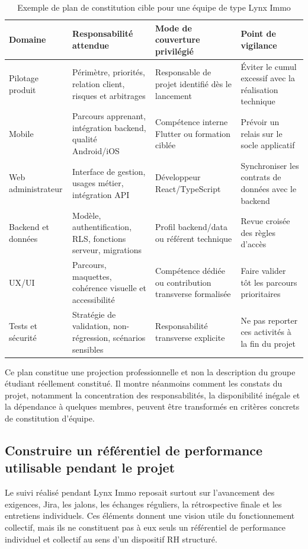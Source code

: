 \begin{table}[H]
\centering
\small
\begin{tabular}{p{3.4cm} p{4.4cm} p{3.3cm} p{3.0cm}}
\toprule
\textbf{Domaine} & \textbf{Responsabilité attendue} & \textbf{Mode de couverture privilégié} & \textbf{Point de vigilance} \\
\midrule
Pilotage produit & Périmètre, priorités, relation client, risques et arbitrages & Responsable de projet identifié dès le lancement & Éviter le cumul excessif avec la réalisation technique \\
Mobile & Parcours apprenant, intégration backend, qualité Android/iOS & Compétence interne Flutter ou formation ciblée & Prévoir un relais sur le socle applicatif \\
Web administrateur & Interface de gestion, usages métier, intégration API & Développeur React/TypeScript & Synchroniser les contrats de données avec le backend \\
Backend et données & Modèle, authentification, RLS, fonctions serveur, migrations & Profil backend/data ou référent technique & Revue croisée des règles d'accès \\
UX/UI & Parcours, maquettes, cohérence visuelle et accessibilité & Compétence dédiée ou contribution transverse formalisée & Faire valider tôt les parcours prioritaires \\
Tests et sécurité & Stratégie de validation, non-régression, scénarios sensibles & Responsabilité transverse explicite & Ne pas reporter ces activités à la fin du projet \\
\bottomrule
\end{tabular}
\caption{Exemple de plan de constitution cible pour une équipe de type Lynx Immo}
\label{tab:lynx-plan-constitution-cible}
\end{table}

Ce plan constitue une projection professionnelle et non la description du groupe étudiant réellement constitué. Il montre néanmoins comment les constats du projet, notamment la concentration des responsabilités, la disponibilité inégale et la dépendance à quelques membres, peuvent être transformés en critères concrets de constitution d'équipe.

\subsection{Construire un référentiel de performance utilisable pendant le projet}

Le suivi réalisé pendant Lynx Immo reposait surtout sur l'avancement des exigences, Jira, les jalons, les échanges réguliers, la rétrospective finale et les entretiens individuels. Ces éléments donnent une vision utile du fonctionnement collectif, mais ils ne constituent pas à eux seuls un référentiel de performance individuel et collectif au sens d'un dispositif RH structuré.

